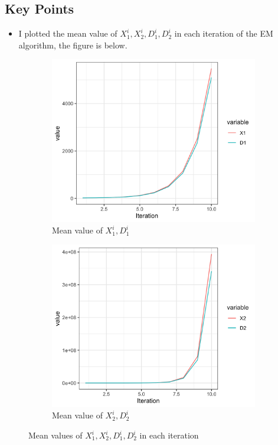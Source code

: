 \documentclass[11pt]{article}
\begin{document}
  \subsection{Key Points}
    \begin{itemize}
      \item I plotted the mean value of $X_1^i,X_2^i,D_1^i,D_2^i$ in each iteration of the EM algorithm, the figure is below.
    \end{itemize}

    \begin{figure}[H]
      \centering
        \begin{subfigure}[b]{0.45\textwidth}
          \includegraphics[width=\textwidth]{../../../output/figures/Optimization/x1_plot.png}
          \caption{Mean value of $X_1^i,D_1^i$}
          \label{fig:f1}
        \end{subfigure}
        \hfill
        \begin{subfigure}[b]{0.45\textwidth}
          \includegraphics[width=\textwidth]{../../../output/figures/Optimization/x2_plot.png}
          \caption{Mean value of $X_2^i,D_2^i$}

        \end{subfigure}
        \caption{Mean values of $X_1^i,X_2^i,D_1^i,D_2^i$ in each iteration}
        \label{fig-em}
    \end{figure}
\end{document}
